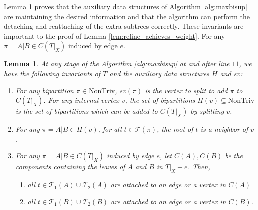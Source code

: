 \documentclass[twocolumn]{bmcart}%
\newcommand{\ntriv}{\mathrm{NonTriv}}
\theoremstyle{mystyle}
\newtheorem{lemma}{Lemma}
\theoremstyle{proofstyle}
\begin{document}
Lemma \ref{lem:invariants} proves that the auxiliary data structures of Algorithm \ref{alg:maxbisup} are maintaining the desired information and that the algorithm can perform the detaching and reattaching of the extra subtrees correctly. These invariants are important to the proof of Lemma \ref{lem:refine_achieves_weight}. For any $\pi = A|B \in C(T|_X)$ induced by edge $e$. 
\begin{lemma} \label{lem:invariants}
    At any stage of the Algorithm \ref{alg:maxbisup} at and after line $11$, we have the following invariants of $T$ and the auxiliary data structures $H$ and $sv$:
        \begin{enumerate}
        \item For any bipartition $\pi \in \ntriv $, $sv(\pi)$ is the vertex to split to add $\pi$ to $C(T|_X)$. For any internal vertex $v$, the set of bipartitions $H(v) \subseteq \ntriv $ is the set of bipartitions which can be added to $C(T|_X)$ by splitting $v$.       
        \item For any $\pi = A|B \in H(v)$, for all $t \in \mathcal{T}(\pi)$, the root of $t$ is a neighbor of $v$.
        \item For any $\pi = A|B \in C(T|_X)$ induced by edge $e$, let $C(A), C(B)$ be the components containing the leaves of $A$ and $B$ in $T|_X - e$. Then, 
        \begin{enumerate}
            \item all $t \in \mathcal{T}_1(A)\cup \mathcal{T}_2(A)$ are attached to an edge or a vertex in $C(A)$
            \item all $t \in \mathcal{T}_1(B)\cup \mathcal{T}_2(B)$ are attached to an edge or a vertex in $C(B)$.
        \end{enumerate}
    \end{enumerate}
\end{lemma}
\end{document}
